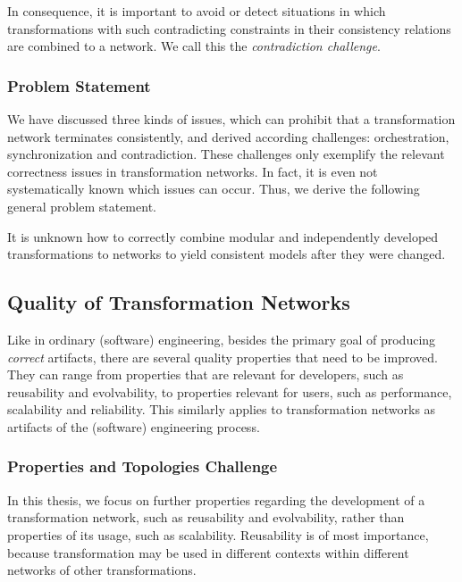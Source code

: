 In consequence, it is important to avoid or detect situations in which transformations with such contradicting constraints in their consistency relations are combined to a network.
We call this the \emph{contradiction challenge}.

\subsubsection*{Problem Statement}

We have discussed three kinds of issues, which can prohibit that a transformation network terminates consistently, and derived according challenges: orchestration, synchronization and contradiction.
These challenges only exemplify the relevant correctness issues in transformation networks. 
In fact, it is even not systematically known which issues can occur.
Thus, we derive the following general problem statement.

\begin{problemstatement}
    It is unknown how to correctly combine modular and independently developed transformations to networks to yield consistent models after they were changed.
\end{problemstatement}

\subsection{Quality of Transformation Networks}

Like in ordinary (software) engineering, besides the primary goal of producing \emph{correct} artifacts, there are several quality properties that need to be improved.
They can range from properties that are relevant for developers, such as reusability and evolvability, to properties relevant for users, such as performance, scalability and reliability.
This similarly applies to transformation networks as artifacts of the (software) engineering process.

\subsubsection*{Properties and Topologies Challenge}

In this thesis, we focus on further properties regarding the development of a transformation network, such as reusability and evolvability, rather than properties of its usage, such as scalability.
Reusability is of most importance, because transformation may be used in different contexts within different networks of other transformations.

